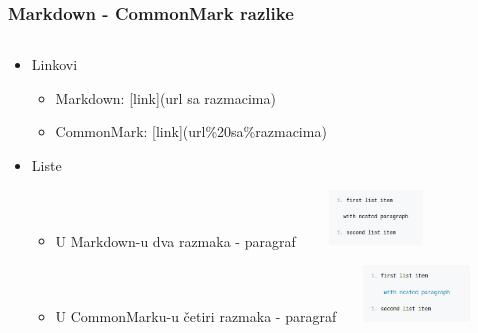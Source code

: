\documentclass{beamer}
\begin{document}
\begin{frame}
	\frametitle{Markdown - CommonMark razlike}

 	\begin{minipage}[0.2\textheight]{\textwidth}
 	\begin{columns}[T]
 	\begin{column}{0.8\textwidth}
 	\begin{itemize}
 		\item{Linkovi
 		\begin{itemize}
 			\item{Markdown: [link](url sa razmacima)}
 			\item{CommonMark: [link](url\%20sa\%razmacima)}
 		\end{itemize}}
 		\item{Liste
 		\begin{itemize}
 			\item{U Markdown-u dva razmaka - paragraf}
 			\includegraphics[width=4cm, height=1.5cm]{Slike/Usporedba1.png}
 			\item{U CommonMarku-u četiri razmaka - paragraf}
 			\includegraphics[width=4cm,  height=1.5cm]{Slike/usporeda2.png}
 		\end{itemize}}
	\end{itemize}
	\end{column}
	\end{columns}
	\end{minipage}

\end{frame}
\end{document}
